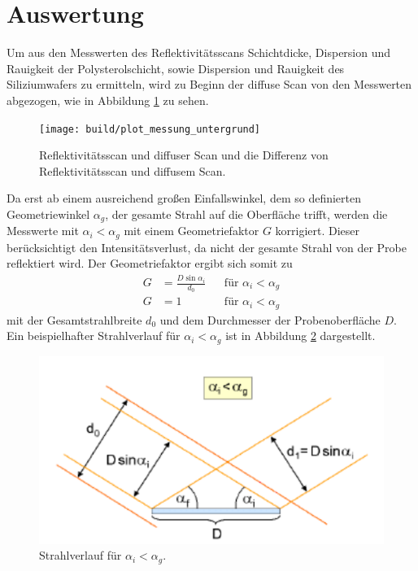 \newpage
\section{Auswertung}
\label{sec:Auswertung}
Um aus den Messwerten des Reflektivitätsscans Schichtdicke, Dispersion
und Rauigkeit der Polysterolschicht, sowie Dispersion und Rauigkeit des Siliziumwafers
zu ermitteln, wird
zu Beginn der diffuse Scan von den Messwerten abgezogen, wie in Abbildung
\ref{fig:diffuse_Scan} zu sehen.

\begin{figure}
  \centering
  \texttt{[image: build/plot\_messung\_untergrund]}
  \caption{Reflektivitätsscan und diffuser Scan und die Differenz von Reflektivitätsscan und diffusem Scan.}
  \label{fig:diffuse_Scan}
\end{figure}

Da erst ab einem ausreichend großen Einfallswinkel,
dem so definierten Geometriewinkel $\alpha_g$,
der gesamte Strahl auf die Oberfläche trifft,
werden die Messwerte mit $\alpha_i < \alpha_g$
mit einem Geometriefaktor $G$ korrigiert.
Dieser berücksichtigt den Intensitätsverlust, da
nicht der gesamte Strahl von der Probe reflektiert wird.
Der Geometriefaktor ergibt sich somit zu
\begin{align}
G&=\frac{D\sin\alpha_i}{d_0} &  &\text{für } \alpha_i<\alpha_g \label{eqn:GEO}\\
G&=1 & &\text{für } \alpha_i<\alpha_g
\end{align}
mit der Gesamtstrahlbreite $d_0$ und dem Durchmesser der Probenoberfläche $D$.
Ein beispielhafter Strahlverlauf für $\alpha_i<\alpha_g$ ist in Abbildung \ref{fig:geo}
dargestellt.
\begin{figure}
  \centering
  \includegraphics{bilder/geo_winkel.PNG}
  \caption{Strahlverlauf für $\alpha_i<\alpha_g$. \cite{sample}}
  \label{fig:geo}
\end{figure}


